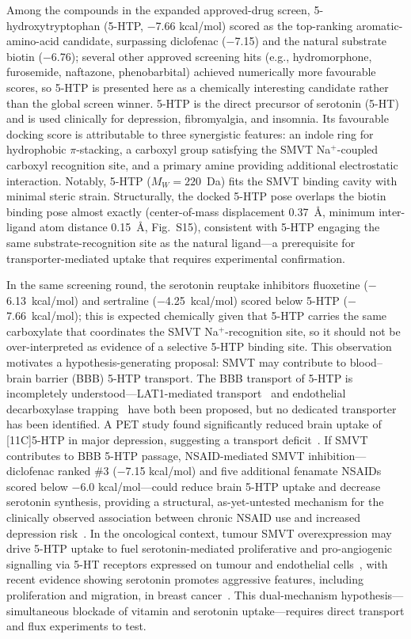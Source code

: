 \documentclass[pdflatex,sn-nature]{sn-jnl}
\begin{document}
Among the compounds in the expanded approved-drug screen, 5-hydroxytryptophan (5-HTP, $-$7.66 kcal/mol) scored as the top-ranking aromatic-amino-acid candidate, surpassing diclofenac ($-$7.15) and the natural substrate biotin ($-$6.76); several other approved screening hits (e.g., hydromorphone, furosemide, naftazone, phenobarbital) achieved numerically more favourable scores, so 5-HTP is presented here as a chemically interesting candidate rather than the global screen winner. 5-HTP is the direct precursor of serotonin (5-HT) and is used clinically for depression, fibromyalgia, and insomnia. Its favourable docking score is attributable to three synergistic features: an indole ring for hydrophobic $\pi$-stacking, a carboxyl group satisfying the SMVT \mbox{Na$^+$}-coupled carboxyl recognition site, and a primary amine providing additional electrostatic interaction. Notably, 5-HTP ($M_W=220$~Da) fits the SMVT binding cavity with minimal steric strain. Structurally, the docked 5-HTP pose overlaps the biotin binding pose almost exactly (center-of-mass displacement 0.37~\AA{}, minimum inter-ligand atom distance 0.15~\AA{}, Fig.~S15), consistent with 5-HTP engaging the same substrate-recognition site as the natural ligand---a prerequisite for transporter-mediated uptake that requires experimental confirmation.

In the same screening round, the serotonin reuptake inhibitors fluoxetine ($-$6.13~kcal/mol) and sertraline ($-$4.25~kcal/mol) scored below 5-HTP ($-$7.66~kcal/mol); this is expected chemically given that 5-HTP carries the same carboxylate that coordinates the SMVT \mbox{Na$^+$}-recognition site, so it should not be over-interpreted as evidence of a selective 5-HTP binding site. This observation motivates a hypothesis-generating proposal: SMVT may contribute to blood--brain barrier (BBB) 5-HTP transport. The BBB transport of 5-HTP is incompletely understood---LAT1-mediated transport~\cite{kanai1998} and endothelial decarboxylase trapping~\cite{hardebo1979} have both been proposed, but no dedicated transporter has been identified. A PET study found significantly reduced brain uptake of [11C]5-HTP in major depression, suggesting a transport deficit~\cite{agren1991}. If SMVT contributes to BBB 5-HTP passage, NSAID-mediated SMVT inhibition---diclofenac ranked \#3 ($-$7.15 kcal/mol) and five additional fenamate NSAIDs scored below $-$6.0 kcal/mol---could reduce brain 5-HTP uptake and decrease serotonin synthesis, providing a structural, as-yet-untested mechanism for the clinically observed association between chronic NSAID use and increased depression risk~\cite{shaikh2023}. In the oncological context, tumour SMVT overexpression may drive 5-HTP uptake to fuel serotonin-mediated proliferative and pro-angiogenic signalling via 5-HT receptors expressed on tumour and endothelial cells~\cite{peters2014}, with recent evidence showing serotonin promotes aggressive features, including proliferation and migration, in breast cancer~\cite{paixao2026}. This dual-mechanism hypothesis---simultaneous blockade of vitamin and serotonin uptake---requires direct transport and flux experiments to test.
\end{document}
